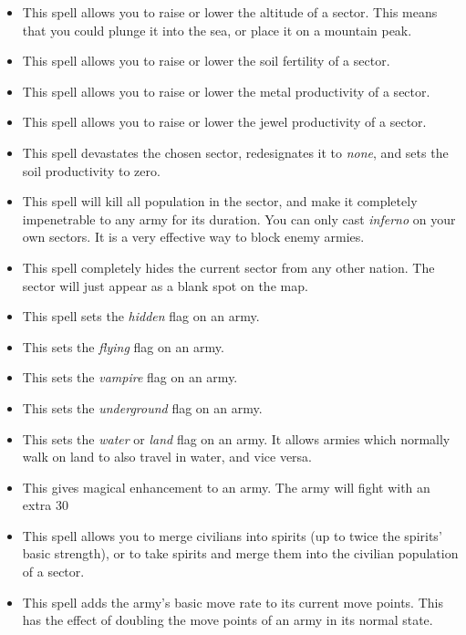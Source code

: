 \begin{itemize}
\item
{}
This spell allows you to raise or lower the altitude of a sector.
This means that you could plunge it into the sea, or place it on a
mountain peak.
\item
{}
This spell allows you to raise or lower the soil fertility of a sector.
\item
{}
This spell allows you to raise or lower the metal productivity of a
sector.
\item
{}
This spell allows you to raise or lower the jewel productivity of a
sector.
\item
{}
This spell devastates the chosen sector, redesignates it to
{\em none}, and sets the soil productivity to zero.
\item
{}
This spell will kill all population in the sector, and make it
completely impenetrable to any army for its duration.  You can only
cast {\em inferno} on your own sectors.  It is a very effective
way to block enemy armies.
\item
{}
This spell completely hides the current sector from any other nation.
The sector will just appear as a blank spot on the map.
\item
{}
This spell sets the {\em hidden} flag on an army.
\item
{}
This sets the {\em flying} flag on an army.
\item
{}
This sets the {\em vampire} flag on an army.
\item
{}
This sets the {\em underground} flag on an army.
\item
{}
This sets the {\em water} or {\em land} flag on an army.  It allows
armies which normally walk on land to also travel in water, and vice versa.
\item
{}
This gives magical enhancement to an army.  The army will fight with an
extra 30%
\item
{}
This spell allows you to merge civilians into spirits (up to twice the
spirits' basic strength), or to take spirits and merge them into the
civilian population of a sector.
\item
{}
This spell adds the army's basic move rate to its current move points.
This has the effect of doubling the move points of an army in its
normal state.  
\end{itemize}

